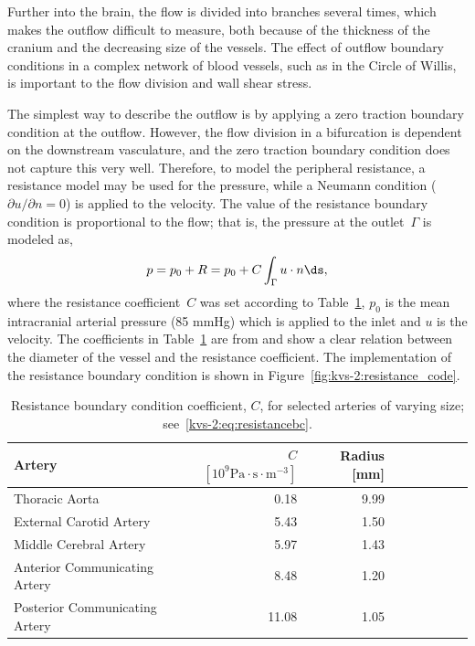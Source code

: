 Further into the brain, the flow is divided into branches several
times, which makes the outflow difficult to measure, both because of
the thickness of the cranium and the decreasing size of the vessels.
The effect of outflow boundary conditions in a complex network of
blood vessels, such as in the Circle of Willis, is important to the
flow division and wall shear stress.

The simplest way to describe the outflow is by applying a zero
traction boundary condition at the outflow. However, the flow division
in a bifurcation is dependent on the downstream vasculature, and the
zero traction boundary condition does not capture this very
well. Therefore, to model the peripheral resistance, a resistance
model may be used for the pressure, while a Neumann condition
(${\partial u / \partial n} = 0 $) is applied to the velocity. The
value of the resistance boundary condition is proportional to the
flow; that is, the pressure at the outlet~$\Gamma$ is modeled as,
\begin{equation} \label{kvs-2:eq:resistancebc}
  p = p_0 + R = p_0 + C \int_\Gamma u \cdot n \ds,
\end{equation}
where the resistance coefficient~$C$ was set according to
Table~\ref{resistance_coeff}, $p_0$ is the mean intracranial arterial
pressure (85 mmHg) which is applied to the inlet and $u$ is the
velocity. The coefficients in Table~\ref{resistance_coeff} are
from \citet{AlastrueyParkerPeiroEtAl2007} and show a clear relation
between the diameter of the vessel and the resistance coefficient. The
implementation of the resistance boundary condition is shown in
Figure~\ref{fig:kvs-2:resistance_code}.

\begin{table}
  \centering
  \begin{tabular}{l*{7}{r}r}
    Artery & $C$ $ [10^9 \mathrm{Pa} \cdot \mathrm{s}  \cdot \mathrm{m}^{-3}]$ & Radius [mm]\\
    \hline
    Thoracic Aorta			&  0.18 &  	9.99\\
    External Carotid Artery  	& 5.43   &	1.50\\
    Middle Cerebral Artery  	& 5.97   &	1.43\\
    Anterior Communicating Artery  	& 8.48   &	1.20\\
    Posterior Communicating Artery  & 11.08   &	1.05\\
  \end{tabular}
  \caption{Resistance boundary condition coefficient, $C$,
    for selected arteries of varying size; see~\eqref{kvs-2:eq:resistancebc}.}
  \label{resistance_coeff}
\end{table}

